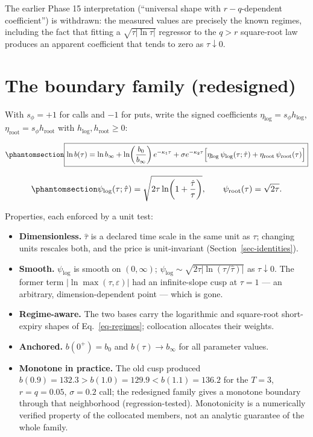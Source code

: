 \documentclass[
  english,
  10pt,
  letterpaper,
  DIV=11,
  numbers=noendperiod]{scrartcl}
\providecommand{\tightlist}{%
  \setlength{\itemsep}{0pt}\setlength{\parskip}{0pt}}
\begin{document}
The earlier Phase 15 interpretation (``universal shape with
\(r-q\)-dependent coefficient'') is withdrawn: the measured values are
precisely the known regimes, including the fact that fitting a
\(\sqrt{\tau|\ln\tau|}\) regressor to the \(q>r\) square-root law
produces an apparent coefficient that tends to zero as
\(\tau\downarrow0\).

\section{The boundary family (redesigned)}\label{sec-family}

With \(s_\phi=+1\) for calls and \(-1\) for puts, write the signed
coefficients \(\eta_{\log}=s_\phi h_{\log}\),
\(\eta_{\mathrm{root}}=s_\phi
h_{\mathrm{root}}\) with \(h_{\log},h_{\mathrm{root}}\ge0\):

\begin{equation}\protect\phantomsection\label{eq-family}{
\boxed{
\ln b(\tau)=\ln b_\infty+\ln\!\left(\frac{b_0}{b_\infty}\right)e^{-\kappa_1\tau}
+\sigma e^{-\kappa_2\tau}\Big[
\eta_{\log}\,\psi_{\log}(\tau;\hat\tau)
+\eta_{\mathrm{root}}\,\psi_{\mathrm{root}}(\tau)
\Big]
}
}\end{equation}

\begin{equation}\protect\phantomsection\label{eq-shapes}{
\psi_{\log}(\tau;\hat\tau)=\sqrt{2\tau\ln\!\left(1+\frac{\hat\tau}{\tau}\right)},
\qquad
\psi_{\mathrm{root}}(\tau)=\sqrt{2\tau}.
}\end{equation}

Properties, each enforced by a unit test:

\begin{itemize}
\tightlist
\item
  \textbf{Dimensionless.} \(\hat\tau\) is a declared time scale in the
  same unit as \(\tau\); changing units rescales both, and the price is
  unit-invariant (Section~\ref{sec-identities}).
\item
  \textbf{Smooth.} \(\psi_{\log}\) is smooth on \((0,\infty)\);
  \(\psi_{\log}\sim\sqrt{2\tau|\ln(\tau/\hat\tau)|}\) as
  \(\tau\downarrow0\). The former term \(|\ln\max(\tau,\varepsilon)|\)
  had an infinite-slope cusp at \(\tau=1\) --- an arbitrary,
  dimension-dependent point --- which is gone.
\item
  \textbf{Regime-aware.} The two bases carry the logarithmic and
  square-root short-expiry shapes of Eq.~\ref{eq-regimes}; collocation
  allocates their weights.
\item
  \textbf{Anchored.} \(b(0^+)=b_0\) and \(b(\tau)\to b_\infty\) for all
  parameter values.
\item
  \textbf{Monotone in practice.} The old cusp produced
  \(b(0.9)=132.3>b(1.0)=129.9<b(1.1)=136.2\) for the \(T=3\),
  \(r=q=0.05\), \(\sigma=0.2\) call; the redesigned family gives a
  monotone boundary through that neighborhood (regression-tested).
  Monotonicity is a numerically verified property of the collocated
  members, not an analytic guarantee of the whole family.
\end{itemize}
\end{document}
